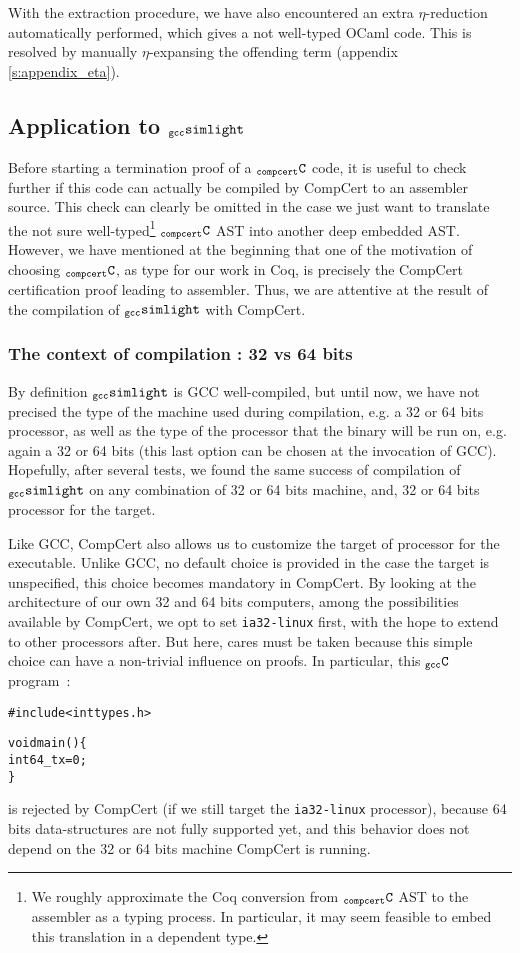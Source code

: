 \documentclass[a4paper, 11pt]{article}
\newenvironment{humC}
  {%
   \begin{alltt}
   \footnotesize}
  {\end{alltt} %
  }
\newcommand{\gccSL}{$_{\tt gcc}{\tt simlight}$\xspace}
\newcommand{\C}{$_{\tt compcert}{\tt C}$\xspace}
\newcommand{\gccC}{$_{\tt gcc}{\tt C}$\xspace}
\begin{document}
With the extraction procedure, we have also encountered an extra $\eta$-reduction automatically performed, which gives a not well-typed OCaml code. This is resolved by manually $\eta$-expansing the offending term (appendix \ref{s:appendix_eta}).

\subsection{Application to \gccSL}
Before starting a termination proof of a \C code, it is useful to check further if this code can actually be compiled by CompCert to an assembler source. This check can clearly be omitted in the case we just want to translate the not sure well-typed\footnote{We roughly approximate the Coq conversion from \C AST to the assembler as a typing process. In particular, it may seem feasible to embed this translation in a dependent type.} \C AST into another deep embedded AST.
However, we have mentioned at the beginning that one of the motivation of choosing \C, as type for our work in Coq, is precisely the CompCert certification proof leading to assembler. Thus, we are attentive at the result of the compilation of \gccSL with CompCert.
\subsubsection{The context of compilation : 32 vs 64 bits}
By definition \gccSL is GCC well-compiled, but until now, we have not precised the type of the machine used during compilation, e.g. a 32 or 64 bits processor, as well as the type of the processor that the binary will be run on, e.g. again a 32 or 64 bits (this last option can be chosen at the invocation of GCC). Hopefully, after several tests, we found the same success of compilation of \gccSL on any combination of 32 or 64 bits machine, and, 32 or 64 bits processor for the target.

Like GCC, CompCert also allows us to customize the target of processor for the executable. Unlike GCC, no default choice is provided in the case the target is unspecified, this choice becomes mandatory in CompCert. By looking at the architecture of our own 32 and 64 bits computers, among the possibilities available by CompCert, we opt to set \verb|ia32-linux| first, with the hope to extend to other processors after. But here, cares must be taken because this simple choice can have a non-trivial influence on proofs. In particular, this \gccC program~:
\begin{humC}
#include <inttypes.h>

void main() \{
  int64_t x = 0;
\}
\end{humC}
is rejected by CompCert (if we still target the \verb|ia32-linux| processor), because 64 bits data-structures are not fully supported yet, and this behavior does not depend on the 32 or 64 bits machine CompCert is running.
\end{document}
